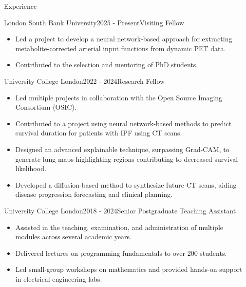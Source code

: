 \documentclass{cv}
\begin{document}
    \begin{rSection}{Experience}
        \item \begin{rSubsection}{London South Bank University}{2025 - Present}{Visiting Fellow}{}
            \item \begin{itemize}
                \item Led a project to develop a neural network-based approach for extracting metabolite-corrected arterial input functions from dynamic PET data.
                \item Contributed to the selection and mentoring of PhD students.
            \end{itemize}
        \end{rSubsection}
        
        \item \begin{rSubsection}{University College London}{2022 - 2024}{Research Fellow}{}
            \item \begin{itemize}
                \item Led multiple projects in collaboration with the Open Source Imaging Consortium (OSIC).
                \item Contributed to a project using neural network-based methods to predict survival duration for patients with IPF using CT scans.
                \item Designed an advanced explainable technique, surpassing Grad-CAM, to generate lung maps highlighting regions contributing to decreased survival likelihood.
                \item Developed a diffusion-based method to synthesize future CT scans, aiding disease progression forecasting and clinical planning.
            \end{itemize}
        \end{rSubsection}
        
        \item \begin{rSubsection}{University College London}{2018 - 2024}{Senior Postgraduate Teaching Assistant}{}
            \item \begin{itemize}
                \item Assisted in the teaching, examination, and administration of multiple modules across several academic years.
                \item Delivered lectures on programming fundamentals to over 200 students.
                \item Led small-group workshops on mathematics and provided hands-on support in electrical engineering labs.
            \end{itemize}
        \end{rSubsection}
        

\end{rSection}
\end{document}
